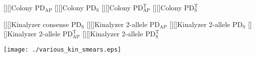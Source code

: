 \documentclass[11pt]{article}
\newcommand{\PDS}{\mathrm{PD_S}}
\newcommand{\PDST}{\mathrm{PD_S^T}}
\newcommand{\W}{\mathrm{PD_{AP}}} %
\newcommand{\WT}{\mathrm{PD_{AP}^T}}
\begin{document}
\pagestyle{empty}

\begin{center}
[][]{{\sf Colony} $\W$}
[][]{{\sf Colony} $\PDS$}
[][]{{\sf Colony} $\WT$}
[][]{{\sf Colony} $\PDST$}

[][]{{\sf Kinalyzer consense} $\PDS$}
[][]{{\sf Kinalyzer 2-allele} $\W$}
[][]{{\sf Kinalyzer 2-allele} $\PDS$}
[][]{{\sf Kinalyzer 2-allele} $\WT$}
[][]{{\sf Kinalyzer 2-allele} $\PDST$}




\texttt{[image: ./various\_kin\_smears.eps]}

\end{center}




 
\end{document}
